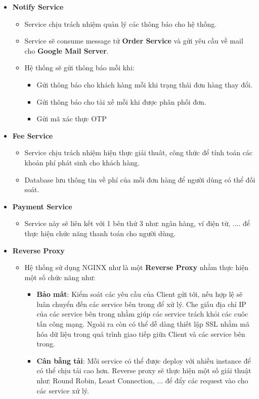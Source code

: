 \begin{itemize}
\begin{itemize}
			\end{itemize}
			\item \textbf{Notify Service}
			\begin{itemize}
				\item Service chịu trách nhiệm quản lý các thông báo cho hệ thống.
				\item Service sẽ consume message tử \textbf{Order Service} và gửi yêu cầu về mail cho \textbf{Google Mail Server}.
				\item Hệ thống sẽ gửi thông báo mỗi khi: 
					\begin{itemize}
						\item Gửi thông báo cho khách hàng mỗi khi trạng thái đơn hàng thay đổi. 
						\item Gửi thông báo cho tài xế mỗi khi được phân phối đơn.
						\item Gửi mã xác thực OTP
					\end{itemize}
			\end{itemize}
			\item \textbf{Fee Service}
			\begin{itemize}
				\item Service chịu trách nhiệm hiện thực giải thuât, công thức để tính toán các khoản phí phát sinh cho khách hàng.
				\item Database lưu thông tin về phí của mỗi đơn hàng để người dùng có thể đối soát.
			\end{itemize}
			\item \textbf{Payment Service}
			\begin{itemize}
				\item Service này sẽ liên kết với 1 bên thứ 3 như: ngân hàng, ví điện từ, .... để thực hiện chức năng thanh toán cho người dùng.
			\end{itemize}
			\item \textbf{Reverse Proxy}
			\begin{itemize}
				\item Hệ thống sử dụng NGINX như là một \textbf{Reverse Proxy} nhằm thực hiện một số chức năng như: 
				\begin{itemize}
					\item \textbf{Bảo mât}: Kiểm soát các yêu cầu của Client gửi tới, nếu hợp lệ sẽ luân chuyển đến các service bên trong để xử lý. Che giấu địa chỉ IP của các service bên trong nhằm giúp các service trách khỏi các cuôc tấn công mạng. Ngoài ra còn có thể dễ dàng thiết lập SSL nhằm mã hóa dữ liệu trong quá trình giao tiếp giữa Client và các service bên trong.
					\item \textbf{Cân bằng tải}: Mỗi service có thể được deploy với nhiều instance để có thể chịu tải cao hơn. Reverse proxy sẽ thực hiện một số giải thuật như: Round Robin, Least Connection, ... để đẩy các request vào cho các service xử lý.
				\end{itemize}
			\end{itemize}
			

\end{itemize}
